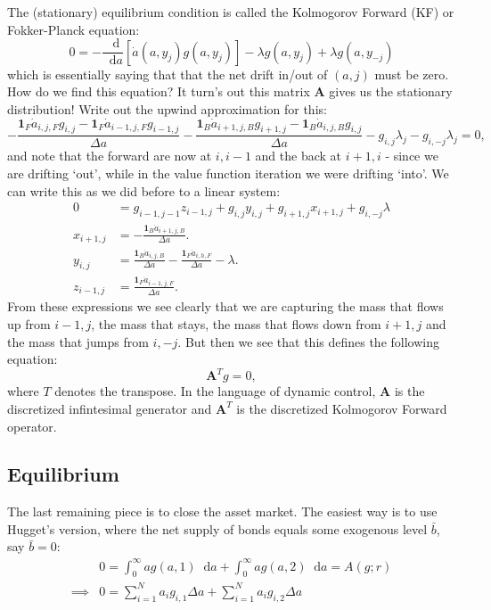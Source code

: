 \documentclass[12pt]{article}
\DeclareMathOperator{\1}{\mathbbm{1}}
\newcommand*\diff{\mathop{}\!\mathrm{d}}
\begin{document}
The (stationary) equilibrium condition is called the Kolmogorov Forward (KF) or Fokker-Planck equation:
\begin{equation}\label{eq:KF}
0 = - \frac{\diff}{\diff a} [\dot a(a,y_j)g(a,y_j)] - \lambda g(a,y_j) + \lambda g(a,y_{-j})
\end{equation}
which is essentially saying that that the net drift in/out of $(a,j)$ must be zero. How do we find this equation? It turn's out this matrix $\mathbf{A}$ gives us the stationary distribution! Write out the upwind approximation for this:
\begin{equation*}
-\frac{\mathbf{1}_F \dot a_{i,j,F} g_{i,j} - \mathbf{1}_F \dot a_{i-1,j,F} g_{i-1,j}}{\Delta a} - \frac{\mathbf{1}_B \dot a_{i+1,j,B} g_{i+1,j} - \mathbf{1}_B \dot a_{i,j,B} g_{i,j}}{\Delta a} - g_{i,j}\lambda_j - g_{i,-j}\lambda_j=0,
\end{equation*}
and note that the forward are now at $i,i-1$ and the back at $i+1,i$ - since we are drifting `out', while in the value function iteration we were drifting `into'. We can write this as we did before to a linear system:
\begin{align*}
0&=g_{i-1,j-1} z_{i-1,j} + g_{i,j} y_{i,j} + g_{i+1,j} x_{i+1,j} + g_{i,-j}\lambda \\
x_{i+1,j} &=  -\frac{\mathbf{1}_B \dot a_{i+1,j,B}}{\Delta a}. \\
y_{i,j} &=  \frac{\mathbf{1}_B \dot a_{i,j,B}}{\Delta a} -\frac{\mathbf{1}_F \dot a_{i,h,F}}{\Delta a} - \lambda. \\
z_{i-1,j} &= \frac{\mathbf{1}_F \dot a_{i-1,j,F}}{\Delta a}.
\end{align*}
From these expressions we see clearly that we are capturing the mass that flows up from $i-1,j$, the mass that stays, the mass that flows down from $i+1,j$ and the mass that jumps from $i,-j$. But then we see that this defines the following equation:
\begin{equation}
\mathbf{A}^{T}g = 0,
\end{equation}
where $T$ denotes the transpose. In the language of dynamic control, $\mathbf{A}$ is the discretized infintesimal generator and $\mathbf{A}^T$ is the discretized Kolmogorov Forward operator.

\subsection{Equilibrium}
The last remaining piece is to close the asset market. The easiest way is to use Hugget's version, where the net supply of bonds equals some exogenous level $\bar b$, say $\bar b = 0$:
\begin{equation*}
\begin{split}
&0=\int_0^\infty ag(a,1) \diff a  + \int_0^\infty ag(a,2) \diff a = A(g;r) \\  \implies  & 0=\sum_{i=1}^N a_ig_{i,1} \Delta a + \sum_{i=1}^N a_ig_{i,2} \Delta a
\end{split}
\end{equation*}
\end{document}
